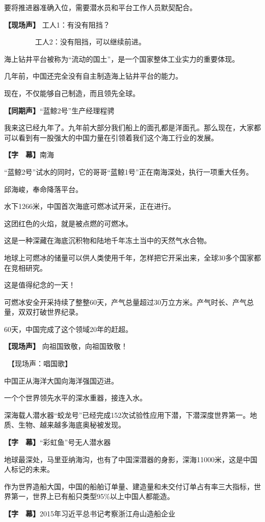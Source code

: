 \documentclass{ctexart}
\newcommand{\zkh}[1]{\textbf{\hspace{-2.7em} 【#1】}}
\begin{document}
 要将推进器准确入位，需要潜水员和平台工作人员默契配合。

 \zkh{现场声} 工人1：有没有阻挡？

 　　　　 工人2：没有阻挡，可以继续前进。

 
海上钻井平台被称为``流动的国土''，是一个国家整体工业实力的重要体现。

 几年前，中国还完全没有自主制造海上钻井平台的能力。

 现在，不仅能够自己制造，而且领先全球。

 \zkh{同期声}``蓝鲸2号''生产经理程骋

我来这已经九年了。九年前大部分我们船上的面孔都是洋面孔。那么现在，大家都可以看到有一股强大的中国力量在引领着我们这个海工行业的发展。

 \zkh{字　幕}南海

 
``蓝鲸2号''试水的同时，它的哥哥``蓝鲸1号''正在南海深处，执行一项重大任务。

 邱海峻，奉命降落平台。

 水下1266米，中国首次海底可燃冰试开采，正在进行。

 这团红色的火焰，就是被点燃的可燃冰。

 这是一种深藏在海底沉积物和陆地千年冻土当中的天然气水合物。

地球上可燃冰的储量可以供人类使用千年，怎样把它开采出来，全球30多个国家都在竞相研究。

 这是值得纪念的一天！

可燃冰安全开采持续了整整60天，产气总量超过30万立方米。产气时长、产气总量，双双打破世界纪录。

 60天，中国完成了这个领域20年的赶超。

 \zkh{现场声} 向祖国致敬，向祖国致敬！

 　【现场声：唱国歌】 
 
 中国正从海洋大国向海洋强国迈进。

 一个个世界领先水平的深水重器，接连入水。

深海载人潜水器``蛟龙号''已经完成152次试验性应用下潜，下潜深度世界第一。地质、生物、越来越多海底奥秘被发现。

 \zkh{字　幕}``彩虹鱼''号无人潜水器

地球最深处，马里亚纳海沟，也有了中国深潜器的身影，深海11000米，这是中国人标记的未来。

作为世界造船大国，中国的船舶订单量、建造量和未交付订单占有率三大指标，世界第一，世界上已有船只类型95{\%}以上中国人都能造。

 \zkh{字　幕}2015年习近平总书记考察浙江舟山造船企业
\end{document}
